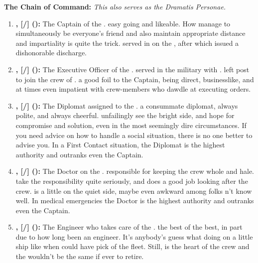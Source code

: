 \documentclass[blue]{TMFHope}
\begin{document}
{\bf The \pNew{} Chain of Command:} \emph{This also serves as the Dramatis Personae.}
\begin{enumerate}
  \item \textbf{\cCap{\full}, [\cCap{\they}/\cCap{\them}] (\cCap{\MYplayer}):} The Captain of the \pNew{}. \cCap{\They} \cCap{\are} easy going and likeable. How \cCap{\they} manage\cCap{\plural} to simultaneously be everyone's friend and also maintain appropriate distance and impartiality is quite the trick. \cCap{\They} served in \pBattle{} on the \pOld{}, after which \cCap{\they} \cCap{\were} issued a dishonorable discharge.
  
  \item \textbf{\cXO{\full}, [\cXO{\they}/\cXO{\them}] (\cXO{\MYplayer}):} The Executive Officer of the \pNew{}. \cXO{} served in the \pPlan{} military with \cCap{}. \cXO{\They} left \cXO{\their} post to join the crew of \pNew{}. \cXO{\They} \cXO{\are} a good foil to the Captain, being direct, businesslike, and at times even impatient with crew-members who dawdle at executing orders.
  
  \item \textbf{\cDip{\full}, [\cDip{\they}/\cDip{\them}] (\cDip{\MYplayer}):} The Diplomat assigned to the \pNew{}. \cDip{\They} \cDip{\are} a consummate diplomat, always polite, and always cheerful. \cDip{\They} unfailingly see the bright side, and \cDip{\have} hope for compromise and solution, even in the most seemingly dire circumstances. If you need advice on how to handle a social situation, there is no one better to advise you. In a First Contact situation, the Diplomat is the highest authority and outranks even the Captain.
  
  \item \textbf{\cMed{\full}, [\cMed{\they}/\cMed{\them}] (\cMed{\MYplayer}):} The Doctor on the  \pNew{}. \cMed{\They} \cMed{\are} responsible for keeping the crew whole and hale. \cMed{\They} take\cMed{\plural} the responsibility quite seriously, and does a good job looking after the crew. \cMed{} is a little on the quiet side, maybe even awkward among folks \cMed{\they} \cMed{\does}n't know well. In medical emergencies the Doctor is the highest authority and outranks even the Captain.
  
  \item \textbf{\cEng{\full}, [\cEng{\they}/\cEng{\them}] (\cEng{\MYplayer}):} The Engineer who takes care of the \pNew{}. \cEng{\They} \cEng{\are} the best of the best, in part due to how long \cEng{\they} \cEng{\have} been an engineer. It's anybody's guess what \cEng{\they} \cEng{\are} doing on a little ship like \pNew{} when \cEng{\they} could have \cEng{\their} pick of the fleet. Still, \cEng{} is the heart of the crew and the \pNew{} wouldn't be the same if \cEng{\they} \cEng{\were} ever to retire.
  

\end{enumerate}
\end{document}
